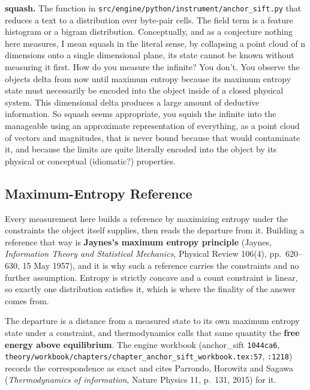 \noindent\textbf{squash.} The function in \texttt{src/\allowbreak{}engine/\allowbreak{}python/\allowbreak{}instrument/\allowbreak{}anchor\_\allowbreak{}sift.\allowbreak{}py} that reduces a text to a distribution over byte-pair cells. The field term is a feature histogram or a bigram distribution. Conceptually, and as a conjecture nothing here measures, I mean squash in the literal sense, by collapsing a point cloud of n dimensions onto a single dimensional plane, its state cannot be known without measuring it first. How do you measure the infinite? You don't. You observe the objects delta from now until maximum entropy because its maximum entropy state must necessarily be encoded into the object inside of a closed physical system. This dimensional delta produces a large amount of deductive information. So squash seems appropriate, you squish the infinite into the manageable using an approximate representation of everything, as a point cloud of vectors and magnitudes, that is never bound because that would contaminate it, and because the limits are quite literally encoded into the object by its physical or conceptual (idiomatic?) properties.

\subsection{Maximum-Entropy Reference}

Every measurement here builds a reference by maximizing entropy under the constraints the object itself supplies, then reads the departure from it. Building a reference that way is \textbf{Jaynes's maximum entropy principle} (Jaynes, \emph{Information Theory and Statistical Mechanics}, Physical Review 106(4), pp.~620--630, 15 May 1957), and it is why such a reference carries the constraints and no further assumption. Entropy is strictly concave and a count constraint is linear, so exactly one distribution satisfies it, which is where the finality of the answer comes from.

The departure is a distance from a measured state to its own maximum entropy state under a constraint, and thermodynamics calls that same quantity the \textbf{free energy above equilibrium}. The engine workbook (anchor\_sift \texttt{1044ca6}, \texttt{theory/\allowbreak{}workbook/\allowbreak{}chapters/\allowbreak{}chapter\_\allowbreak{}anchor\_\allowbreak{}sift\_\allowbreak{}workbook.\allowbreak{}tex:57}, \texttt{:1218}) records the correspondence as exact and cites Parrondo, Horowitz and Sagawa (\emph{Thermodynamics of information}, Nature Physics 11, p.~131, 2015) for it.

